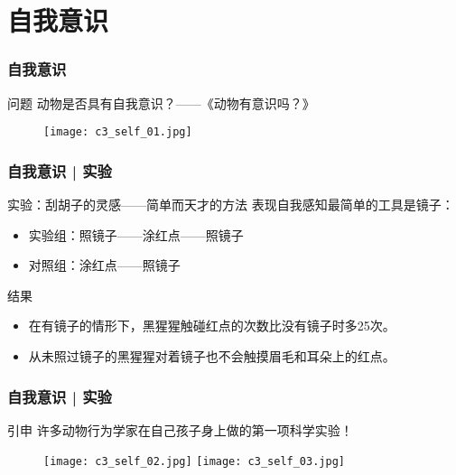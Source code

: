 \section{自我意识}
\begin{frame}
  \frametitle{自我意识}
  \begin{block}{问题}
    动物是否具有自我意识？——《动物有意识吗？》
  \begin{figure}
    \centering
    \texttt{[image: c3\_self\_01.jpg]}
  \end{figure}
  \end{block}
\end{frame}

\begin{frame}
  \frametitle{自我意识 | 实验}
  \begin{block}{实验：刮胡子的灵感——简单而天才的方法}
表现自我感知最简单的工具是镜子：
    \begin{itemize}
      \item 实验组：照镜子——涂红点——照镜子
      \item 对照组：涂红点——照镜子
    \end{itemize}
  \end{block}
  \pause
  \begin{block}{结果}
    \begin{itemize}
      \item 在有镜子的情形下，黑猩猩触碰红点的次数比没有镜子时多25次。
      \item 从未照过镜子的黑猩猩对着镜子也不会触摸眉毛和耳朵上的红点。
    \end{itemize}
  \end{block}
\end{frame}

\begin{frame}
  \frametitle{自我意识 | 实验}
  \begin{block}{引申}
    许多动物行为学家在自己孩子身上做的第一项科学实验！
    \begin{figure}
      \centering
      \texttt{[image: c3\_self\_02.jpg]}\quad
      \texttt{[image: c3\_self\_03.jpg]}
    \end{figure}
  \end{block}
\end{frame}

